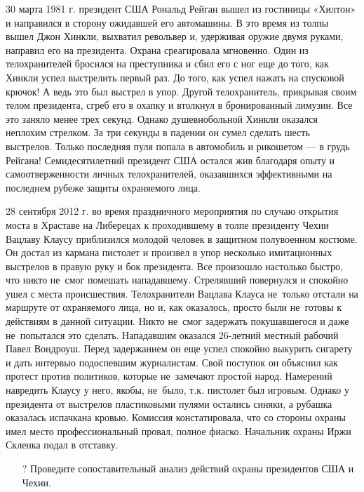 \documentclass[a4paper,12pt,fleqn]{article} %
\begin{document}
\begin{tcolorbox}[colback=blue!55!red!5!,colframe=blue!55!red,enforce breakable,%
	pad at break=1mm, title=Кейс 29. Инциденты при охране физических лиц]

	30 марта 1981 г. президент США Рональд Рейган вышел из гостиницы «Хилтон» и направился в сторону ожидавшей его автомашины. В это время из толпы вышел Джон Хинкли, выхватил револьвер и, удерживая оружие двумя руками, направил его на президента. Охрана среагировала мгновенно. Один из телохранителей бросился на преступника и сбил его с ног еще до того, как Хинкли успел выстрелить первый раз. До того, как успел нажать на спусковой крючок! А ведь это был выстрел в упор. Другой телохранитель, прикрывая своим телом президента, сгреб его в охапку и втолкнул в бронированный лимузин. Все это заняло менее трех секунд. Однако душевнобольной Хинкли оказался неплохим стрелком. За три секунды в падении он сумел сделать шесть выстрелов. Только последняя пуля попала в автомобиль и рикошетом --- в грудь Рейгана! Семидесятилетний президент США остался жив благодаря опыту и самоотверженности личных телохранителей, оказавшихся эффективными на последнем рубеже защиты охраняемого лица. 
	
	28 сентября 2012 г. во время праздничного мероприятия по случаю открытия моста в Храставе на Либерецах к проходившему в толпе президенту Чехии Вацлаву Клаусу приблизился молодой человек в защитном полувоенном костюме. Он достал из кармана пистолет и произвел в упор несколько имитационных выстрелов в правую руку и бок президента. Все произошло настолько быстро, что никто не~смог помешать нападавшему. Стрелявший повернулся и спокойно ушел с места происшествия. Телохранители Вацлава Клауса не~только отстали на маршруте от охраняемого лица, но и, как оказалось, просто были не~готовы к действиям в данной ситуации. Никто не~смог задержать покушавшегося и даже не~попытался это сделать. Нападавшим оказался 26-летний местный рабочий Павел Вондроуш. Перед задержанием он еще успел спокойно выкурить сигарету и дать интервью подоспевшим журналистам. Свой поступок он объяснил как протест против политиков, которые не~замечают простой народ. Намерений навредить Клаусу у него, якобы, не~было, т.к. пистолет был игровым. Однако у президента от выстрелов пластиковыми пулями остались синяки, а рубашка оказалась испачкана кровью. Комиссия констатировала, что со стороны охраны имел место профессиональный провал, полное фиаско. Начальник охраны Иржи Скленка подал в отставку.

\begin{itemize}
	\item[{\color{blue!55!red}\Huge {  $ ? $}} \quad]   Проведите сопоставительный анализ действий охраны президентов США и Чехии.
\end{itemize}	

\end{tcolorbox}
\end{document}
